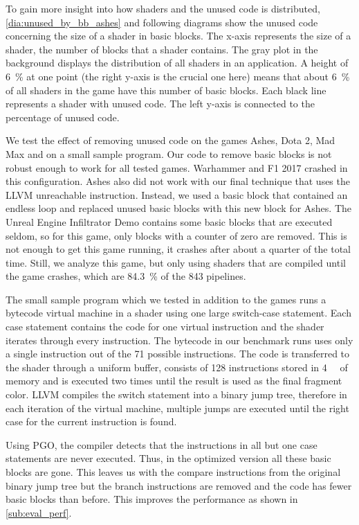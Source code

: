 To gain more insight into how shaders and the unused code is distributed, \cref{dia:unused_by_bb_ashes} and following diagrams show the unused code concerning the size of a shader in basic blocks.
The x-axis represents the size of a shader, the number of blocks that a shader contains.
The gray plot in the background displays the distribution of all shaders in an application.
A height of \SI{6}{\percent} at one point (the right y-axis is the crucial one here) means that about \SI{6}{\percent} of all shaders in the game have this number of basic blocks.
Each black line represents a shader with unused code. The left y-axis is connected to the percentage of unused code.


We test the effect of removing unused code on the games Ashes, Dota 2, Mad Max and on a small sample program.
Our code to remove basic blocks is not robust enough to work for all tested games. Warhammer and F1 2017 crashed in this configuration.
Ashes also did not work with our final technique that uses the LLVM unreachable instruction.
Instead, we used a basic block that contained an endless loop and replaced unused basic blocks with this new block for Ashes.
The Unreal Engine Infiltrator Demo contains some basic blocks that are executed seldom, so for this game, only blocks with a counter of zero are removed.
This is not enough to get this game running, it crashes after about a quarter of the total time.
Still, we analyze this game, but only using shaders that are compiled until the game crashes, which are \SI{84.3}{\percent} of the 843 pipelines.

The small sample program which we tested in addition to the games runs a bytecode virtual machine in a shader using one large switch-case statement.
Each case statement contains the code for one virtual instruction and the shader iterates through every instruction.
The bytecode in our benchmark runs uses only a single instruction out of the 71 possible instructions.
The code is transferred to the shader through a uniform buffer, consists of 128 instructions stored in \SI{4}{\kibi\byte} of memory and is executed two times until the result is used as the final fragment color.
LLVM compiles the switch statement into a binary jump tree, therefore in each iteration of the virtual machine, multiple jumps are executed until the right case for the current instruction is found.

Using PGO, the compiler detects that the instructions in all but one case statements are never executed.
Thus, in the optimized version all these basic blocks are gone.
This leaves us with the compare instructions from the original binary jump tree but the branch instructions are removed and the code has fewer basic blocks than before.
This improves the performance as shown in \cref{sub:eval_perf}.

